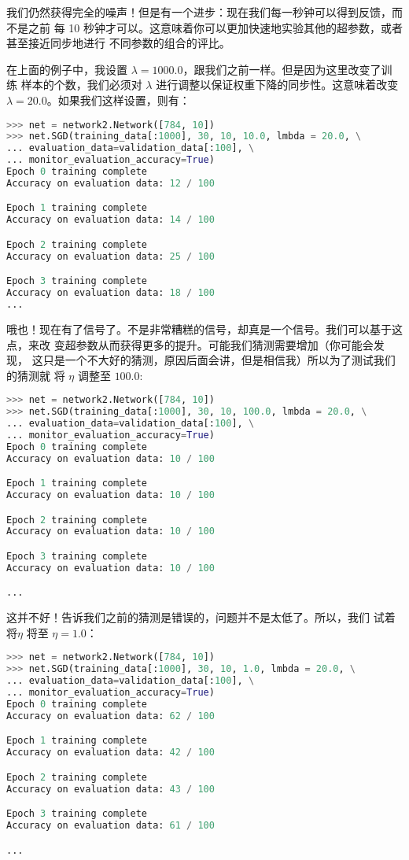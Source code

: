 我们仍然获得完全的噪声！但是有一个进步：现在我们每一秒钟可以得到反馈，而不是之前
每 10 秒钟才可以。这意味着你可以更加快速地实验其他的超参数，或者甚至接近同步地进行
不同参数的组合的评比。

在上面的例子中，我设置 $\lambda=1000.0$，跟我们之前一样。但是因为这里改变了训练
样本的个数，我们必须对 $\lambda$ 进行调整以保证权重下降的同步性。这意味着改变
$\lambda = 20.0$。如果我们这样设置，则有：

\begin{lstlisting}[language=Python]
>>> net = network2.Network([784, 10])
>>> net.SGD(training_data[:1000], 30, 10, 10.0, lmbda = 20.0, \
... evaluation_data=validation_data[:100], \
... monitor_evaluation_accuracy=True)
Epoch 0 training complete
Accuracy on evaluation data: 12 / 100

Epoch 1 training complete
Accuracy on evaluation data: 14 / 100

Epoch 2 training complete
Accuracy on evaluation data: 25 / 100

Epoch 3 training complete
Accuracy on evaluation data: 18 / 100
...
\end{lstlisting}

哦也！现在有了信号了。不是非常糟糕的信号，却真是一个信号。我们可以基于这点，来改
变超参数从而获得更多的提升。可能我们猜测\learningrate{}需要增加（你可能会发现，
这只是一个不大好的猜测，原因后面会讲，但是相信我）所以为了测试我们的猜测就
将 $\eta$ 调整至 $100.0$:
\begin{lstlisting}[language=Python]
>>> net = network2.Network([784, 10])
>>> net.SGD(training_data[:1000], 30, 10, 100.0, lmbda = 20.0, \
... evaluation_data=validation_data[:100], \
... monitor_evaluation_accuracy=True)
Epoch 0 training complete
Accuracy on evaluation data: 10 / 100

Epoch 1 training complete
Accuracy on evaluation data: 10 / 100

Epoch 2 training complete
Accuracy on evaluation data: 10 / 100

Epoch 3 training complete
Accuracy on evaluation data: 10 / 100

...
\end{lstlisting}

这并不好！告诉我们之前的猜测是错误的，问题并不是\learningrate{}太低了。所以，我们
试着将$\eta$ 将至 $\eta=1.0$：
\begin{lstlisting}[language=Python]
>>> net = network2.Network([784, 10])
>>> net.SGD(training_data[:1000], 30, 10, 1.0, lmbda = 20.0, \
... evaluation_data=validation_data[:100], \
... monitor_evaluation_accuracy=True)
Epoch 0 training complete
Accuracy on evaluation data: 62 / 100

Epoch 1 training complete
Accuracy on evaluation data: 42 / 100

Epoch 2 training complete
Accuracy on evaluation data: 43 / 100

Epoch 3 training complete
Accuracy on evaluation data: 61 / 100

...
\end{lstlisting}

